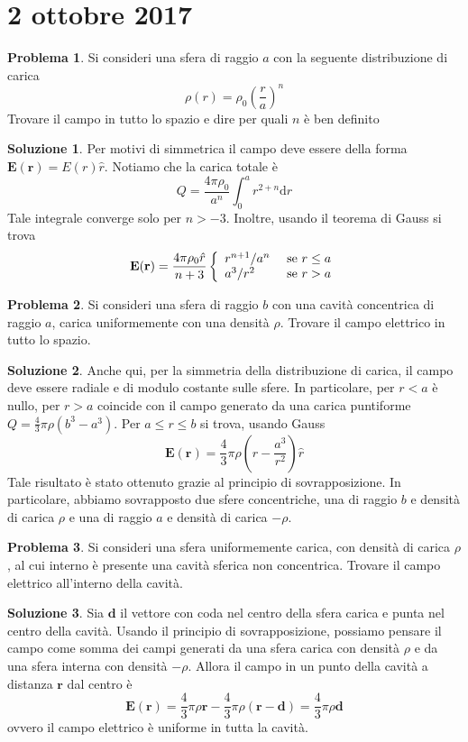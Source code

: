 \documentclass[a4paper,11pt]{book}
\newcommand{\dif}{\mathrm{d}}
\renewcommand{\vec}[1]{\mathbf{#1}}
\theoremstyle{theorem}
\theoremstyle{definition}
\newtheorem{problema}{Problema}[section]
\newtheorem{soluzione}{Soluzione}[section]
\begin{document}
\section{2 ottobre 2017}
\begin{problema}
	Si consideri una sfera di raggio $a$ con la seguente distribuzione di carica
	\[\rho(r)=\rho_0\left(\frac{r}{a}\right)^n\]
	Trovare il campo in tutto lo spazio e dire per quali $n$ è ben definito
\end{problema}
\begin{soluzione}
	Per motivi di simmetrica il campo deve essere della forma $\vec{E}(\vec{r})=E(r)\hat{r}$. Notiamo che la carica totale è
	\[Q=\frac{4\pi\rho_0}{a^n}\int_{0}^{a}r^{2+n}\dif r\]
	Tale integrale converge solo per $n>-3$. Inoltre, usando il teorema di Gauss si trova
	\[\vec{E}(\vec{r})=\frac{4\pi\rho_0\hat{r}}{n+3}\left\{\begin{array}{l l}	
	r^{n+1}/a^n&\textrm{ se }r\leq a\\a^3/r^2&\textrm{ se }r>a
	\end{array}\right.\]
\end{soluzione}
\begin{problema}
	Si consideri una sfera di raggio $b$ con una cavità concentrica di raggio $a$, carica uniformemente con una densità $\rho$. Trovare il campo elettrico in tutto lo spazio.
\end{problema}
\begin{soluzione}
	Anche qui, per la simmetria della distribuzione di carica, il campo deve essere radiale e di modulo costante sulle sfere. In particolare, per $r<a$ è nullo, per $r>a$ coincide con il campo generato da una carica puntiforme $Q=\frac{4}{3}\pi\rho\left(b^3-a^3\right)$. Per $a\leq r\leq b$ si trova, usando Gauss
	\[\vec{E}(\vec{r})=\frac{4}{3}\pi\rho\left(r-\frac{a^3}{r^2}\right)\hat{r}\]
	Tale risultato è stato ottenuto grazie al principio di sovrapposizione. In particolare, abbiamo sovrapposto due sfere concentriche, una di raggio $b$ e densità di carica $\rho$ e una di raggio $a$ e densità di carica $-\rho$.
\end{soluzione}
\begin{problema}
	Si consideri una sfera uniformemente carica, con densità di carica $\rho$, al cui interno è presente una cavità sferica non concentrica. Trovare il campo elettrico all'interno della cavità.	
\end{problema}
\begin{soluzione}
	Sia $\vec{d}$ il vettore con coda nel centro della sfera carica e punta nel centro della cavità. Usando il principio di sovrapposizione, possiamo pensare il campo come somma dei campi generati da una sfera carica con densità $\rho$ e da una sfera interna con densità $-\rho$. Allora il campo in un punto della cavità a distanza $\vec{r}$ dal centro è
	\[\vec{E}(\vec{r})=\frac{4}{3}\pi\rho\vec{r}-\frac{4}{3}\pi\rho\left(\vec{r}-\vec{d}\right)=\frac{4}{3}\pi\rho\vec{d}\]
	ovvero il campo elettrico è uniforme in tutta la cavità.
\end{soluzione}
\end{document}
